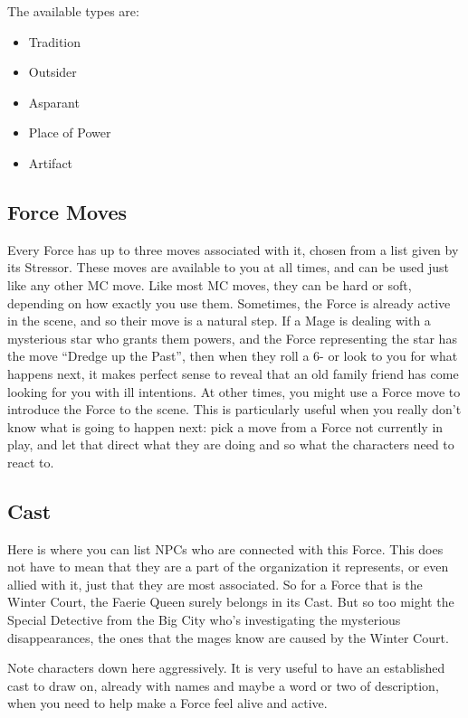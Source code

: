 \documentclass[
  oneside,
  statementpaper,
  9pt]{memoir}
\begin{document}
The available types are:

\begin{itemize}
\item
  Tradition
\item
  Outsider
\item
  Asparant
\item
  Place of Power
\item
  Artifact
\end{itemize}

\hypertarget{force-moves}{%
\subsection{Force Moves}\label{force-moves}}

Every Force has up to three moves associated with it, chosen from a list
given by its Stressor. These moves are available to you at all times,
and can be used just like any other MC move. Like most MC moves, they
can be hard or soft, depending on how exactly you use them. Sometimes,
the Force is already active in the scene, and so their move is a natural
step. If a Mage is dealing with a mysterious star who grants them
powers, and the Force representing the star has the move ``Dredge up the
Past'', then when they roll a 6- or look to you for what happens next,
it makes perfect sense to reveal that an old family friend has come
looking for you with ill intentions. At other times, you might use a
Force move to introduce the Force to the scene. This is particularly
useful when you really don't know what is going to happen next: pick a
move from a Force not currently in play, and let that direct what they
are doing and so what the characters need to react to.

\hypertarget{cast}{%
\subsection{Cast}\label{cast}}

Here is where you can list NPCs who are connected with this Force. This
does not have to mean that they are a part of the organization it
represents, or even allied with it, just that they are most associated.
So for a Force that is the Winter Court, the Faerie Queen surely belongs
in its Cast. But so too might the Special Detective from the Big City
who's investigating the mysterious disappearances, the ones that the
mages know are caused by the Winter Court.

Note characters down here aggressively. It is very useful to have an
established cast to draw on, already with names and maybe a word or two
of description, when you need to help make a Force feel alive and
active.
\end{document}
